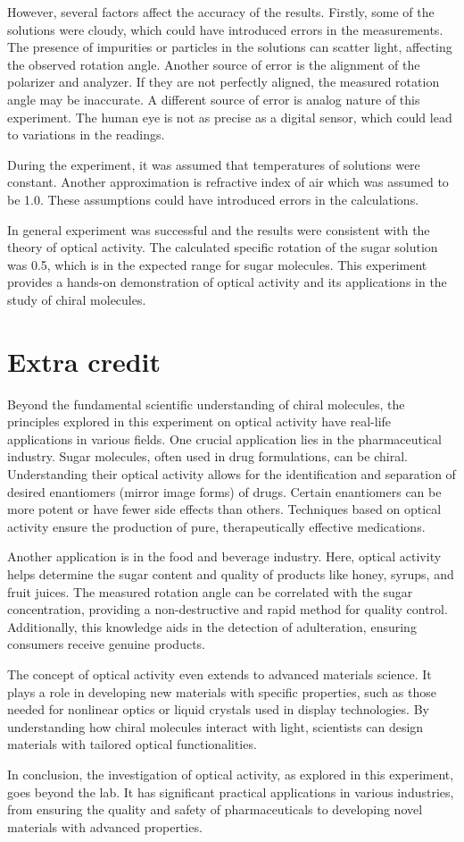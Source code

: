 \documentclass[10pt]{article}
\begin{document}
However, several factors affect the accuracy of the results. Firstly, some of the solutions were cloudy, which could have introduced errors in the measurements. The presence of impurities or particles in the solutions can scatter light, affecting the observed rotation angle. Another source of error is the alignment of the polarizer and analyzer. If they are not perfectly aligned, the measured rotation angle may be inaccurate. A different source of error is analog nature of this experiment. The human eye is not as precise as a digital sensor, which could lead to variations in the readings.

During the experiment, it was assumed that temperatures of solutions were constant. Another approximation is refractive index of air which was assumed to be 1.0. These assumptions could have introduced errors in the calculations.   

In general experiment was successful and the results were consistent with the theory of optical activity. The calculated specific rotation of the sugar solution was 0.5, which is in the expected range for sugar molecules. This experiment provides a hands-on demonstration of optical activity and its applications in the study of chiral molecules.

\section{Extra credit}
Beyond the fundamental scientific understanding of chiral molecules, the principles explored in this experiment on optical activity have real-life applications in various fields. One crucial application lies in the pharmaceutical industry. Sugar molecules, often used in drug formulations, can be chiral. Understanding their optical activity allows for the identification and separation of desired enantiomers (mirror image forms) of drugs. Certain enantiomers can be more potent or have fewer side effects than others. Techniques based on optical activity ensure the production of pure, therapeutically effective medications.

Another application is in the food and beverage industry. Here, optical activity helps determine the sugar content and quality of products like honey, syrups, and fruit juices. The measured rotation angle can be correlated with the sugar concentration, providing a non-destructive and rapid method for quality control. Additionally, this knowledge aids in the detection of adulteration, ensuring consumers receive genuine products.

The concept of optical activity even extends to advanced materials science. It plays a role in developing new materials with specific properties, such as those needed for nonlinear optics or liquid crystals used in display technologies. By understanding how chiral molecules interact with light, scientists can design materials with tailored optical functionalities.

In conclusion, the investigation of optical activity, as explored in this experiment, goes beyond the lab. It has significant practical applications in various industries, from ensuring the quality and safety of pharmaceuticals to developing novel materials with advanced properties.

\printbibliography
\end{document}
